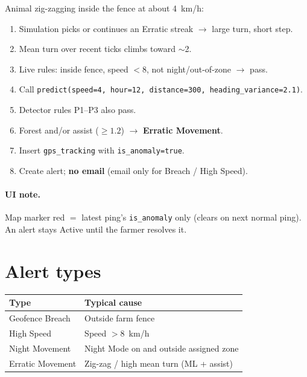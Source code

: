 \documentclass[11pt,a4paper]{article}
\begin{document}
Animal zig-zagging inside the fence at about 4~km/h:

\begin{enumerate}[leftmargin=*]
  \item Simulation picks or continues an Erratic streak $\rightarrow$ large turn, short step.
  \item Mean turn over recent ticks climbs toward $\sim$2.
  \item Live rules: inside fence, speed $< 8$, not night/out-of-zone $\rightarrow$ pass.
  \item Call
        \texttt{predict(speed=4, hour=12, distance=300, heading\_variance=2.1)}.
  \item Detector rules P1--P3 also pass.
  \item Forest and/or assist ($\geq 1.2$) $\rightarrow$ \textbf{Erratic Movement}.
  \item Insert \texttt{gps\_tracking} with \texttt{is\_anomaly=true}.
  \item Create alert; \textbf{no email} (email only for Breach / High Speed).
\end{enumerate}

\paragraph{UI note.}
Map marker red $=$ latest ping's \texttt{is\_anomaly} only (clears on next normal ping).
An alert stays Active until the farmer resolves it.

\section{Alert types}

\begin{center}
\begin{tabular}{@{}lp{9cm}@{}}
\toprule
\textbf{Type} & \textbf{Typical cause} \\
\midrule
Geofence Breach   & Outside farm fence \\
High Speed        & Speed $> 8$~km/h \\
Night Movement    & Night Mode on and outside assigned zone \\
Erratic Movement  & Zig-zag / high mean turn (ML + assist) \\
\bottomrule
\end{tabular}
\end{center}
\end{document}
